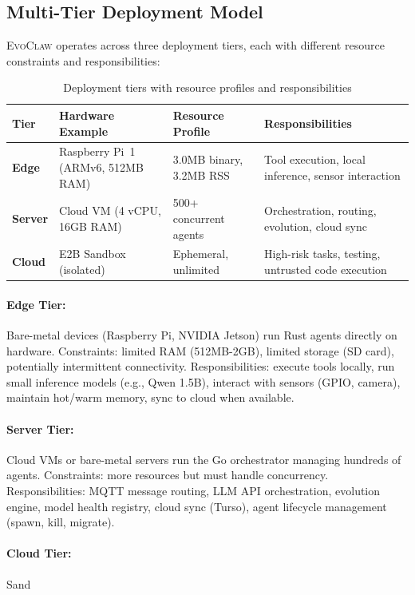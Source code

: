 \documentclass{article}
\newcommand{\evoclaw}{\textsc{EvoClaw}}
\begin{document}
\subsection{Multi-Tier Deployment Model}

\evoclaw{} operates across three deployment tiers, each with different resource constraints and responsibilities:

\begin{table}[h]
\centering
\caption{Deployment tiers with resource profiles and responsibilities}
\small
\begin{tabular}{llll}
\toprule
\textbf{Tier} & \textbf{Hardware Example} & \textbf{Resource Profile} & \textbf{Responsibilities} \\
\midrule
\textbf{Edge} & Raspberry Pi~1 (ARMv6, 512MB RAM) & 3.0MB binary, 3.2MB RSS & Tool execution, local inference, sensor interaction \\
\textbf{Server} & Cloud VM (4 vCPU, 16GB RAM) & 500+ concurrent agents & Orchestration, routing, evolution, cloud sync \\
\textbf{Cloud} & E2B Sandbox (isolated) & Ephemeral, unlimited & High-risk tasks, testing, untrusted code execution \\
\bottomrule
\end{tabular}
\end{table}

\paragraph{Edge Tier:} Bare-metal devices (Raspberry Pi, NVIDIA Jetson) run Rust agents directly on hardware. Constraints: limited RAM (512MB-2GB), limited storage (SD card), potentially intermittent connectivity. Responsibilities: execute tools locally, run small inference models (e.g., Qwen 1.5B), interact with sensors (GPIO, camera), maintain hot/warm memory, sync to cloud when available.

\paragraph{Server Tier:} Cloud VMs or bare-metal servers run the Go orchestrator managing hundreds of agents. Constraints: more resources but must handle concurrency. Responsibilities: MQTT message routing, LLM API orchestration, evolution engine, model health registry, cloud sync (Turso), agent lifecycle management (spawn, kill, migrate).

\paragraph{Cloud Tier:} Sand
\end{document}
